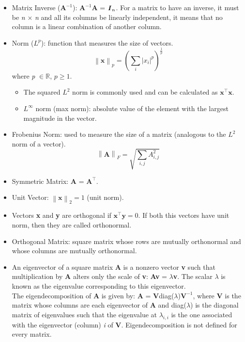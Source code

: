 \documentclass{article}
\begin{document}
\begin{itemize}
\item Matrix Inverse (\(\textbf{A}^{-1}\)): \(\textbf{A}^{-1}\)\textbf{A} =  \(\textbf{\textit{I}}_n\). For a matrix to have an inverse, it must be \textit{n} \(\times\) \textit{n} and all its columns be linearly independent, it means that no column is a linear combination of another column.
\item Norm (\(\textit{L}^{p}\)): function that measures the size of vectors.
\[
	\left\| \textbf{x} \right\|_p = \left(\sum_{i} \left| \textit{x}_{i} \right|^{p} \right)^{\frac{1}{p}}
\]
where \textit{p} \(\in \mathbb{R}\), \(\textit{p} \geq 1.\)
\begin{itemize}
\item The squared \(\textit{L}^{2}\) norm is commonly used and can be calculated as \(\textbf{x}^\top \textbf{x}\).
\item \(\textit{L}^{\infty}\) norm (max norm): absolute value of the element with the largest magnitude in the vector.
\end{itemize}
\item Frobenius Norm: used to measure the size of a matrix (analogous to the \(\textit{L}^{2}\) norm of a vector).
\[
	\left\| \textbf{A} \right\|_F = \sqrt{\sum_{i,j} \textit{A}^2_{i,j}}
\]
\item Symmetric Matrix: \textbf{A} = \(\textbf{A}^\top\).
\item Unit Vector: \(\left\| \textbf{x} \right\|_2 = 1 \) (unit norm).
\item Vectors \textbf{x} and \textbf{y} are orthogonal if \(\textbf{x}^\top\textbf{y} = 0\). If both this vectors have unit norm, then they are called orthonormal.
\item Orthogonal Matrix: square matrix whose rows are mutually orthonormal and whose columns are mutually orthonormal.
\item An eigenvector of a square matrix \textbf{A} is a nonzero vector \textbf{v} such that multiplication by \textbf{A} alters only the scale of \textbf{v}: \textbf{Av} = \(\lambda\)\textbf{v}. The scalar \(\lambda\) is known as the eigenvalue corresponding to this eigenvector.\\The eigendecomposition of \textbf{A} is given by: \textbf{A} = \textbf{V}diag(\textbf{\(\lambda\)})\(\textbf{V}^{-1}\), where \textbf{V} is the matrix whose columns are each eigenvector of \textbf{A} and diag(\textbf{\(\lambda\)}) is the diagonal matrix of eigenvalues such that the eigenvalue at \(\lambda_{i,i}\) is the one associated with the eigenvector (column) \textit{i} of \textbf{V}. Eigendecomposition is not defined for every matrix.

\end{itemize}
\end{document}

